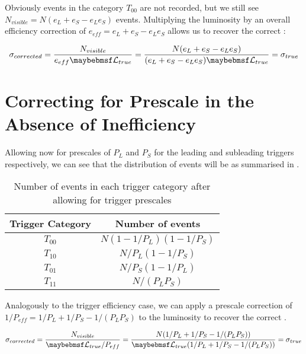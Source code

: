 Obviously events in the category $T_{00}$ are not recorded, but we still see
$N_{visible} = N(e_L + e_S - e_L e_S)$ events. Multiplying the luminosity by an overall
efficiency correction of $e_{eff} = e_L + e_S - e_L e_S$ allows us to recover the
correct \xs:

\begin{equation}
  \sigma_{corrected} = \frac{N_{visible}}{e_{eff} \luminosity_{true}} = \frac{N(e_L + e_S - e_L e_S)}{(e_L + e_S - e_L e_S) \luminosity_{true}} = \sigma_{true}
\end{equation}

\section{Correcting for Prescale in the Absence of Inefficiency}
\label{sec:appendix:prescale_only}
Allowing now for prescales of $P_L$ and $P_S$ for the leading and subleading triggers
respectively, we can see that the distribution of events will be as summarised
in .

\begin{table}
\begin{center}
  \begin{tabular}{ c c }
    Trigger Category & Number of events      \\
    \midrule
    $T_{00}$         & $N(1-1/P_L)(1-1/P_S)$ \\
    $T_{10}$         & $N/P_L (1-1/P_S)$     \\ 
    $T_{01}$         & $N/P_S (1-1/P_L)$     \\
    $T_{11}$         & $N/(P_L P_S)$          \\       
  \end{tabular}
  \caption{Number of events in each trigger category after allowing for trigger
           prescales}
  \label{tab:appendix:trig_prescales}
\end{center}
\end{table}

Analogously to the trigger efficiency case, we can apply a prescale correction of
$1/P_{eff} = 1/P_L + 1/P_S - 1/(P_L P_S)$ to the luminosity to recover the correct
\xs. 

\begin{equation}
  \sigma_{corrected} = \frac{N_{visible}}{\luminosity_{true}/P_{eff}} = \frac{N(1/P_L + 1/P_S - 1/(P_L P_S))}{\luminosity_{true} (1/P_L + 1/P_S - 1/(P_L P_S))} = \sigma_{true}
\end{equation}

